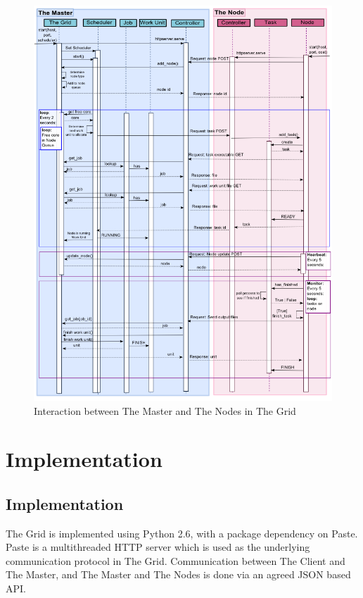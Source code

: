 \begin{figure}[htbp]
\centering
\includegraphics[keepaspectratio,width=\textwidth,height=0.75\textheight]{./figs/servernode.png}
\caption{Interaction between The Master and The Nodes in The Grid}
\end{figure}


\part{Implementation}
\label{implementation}

\chapter{Implementation}
\label{implementation}

The Grid is implemented using Python 2.6, with a package dependency on Paste. Paste is a multithreaded HTTP server which is used as the underlying communication protocol in The Grid. Communication between The Client and The Master, and The Master and The Nodes is done via an agreed JSON based API. 

